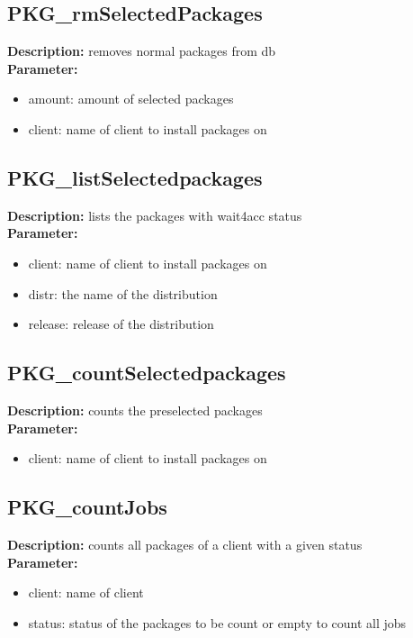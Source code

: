 \subsection{PKG\_rmSelectedPackages}
\textbf{Description:} removes normal packages from db\\
\textbf{Parameter:}
\begin{itemize}
\item amount: amount of selected packages
\item client: name of client to install packages on
\end{itemize}

\subsection{PKG\_listSelectedpackages}
\textbf{Description:} lists the packages with wait4acc status\\
\textbf{Parameter:}
\begin{itemize}
\item client: name of client to install packages on
\item distr: the name of the distribution
\item release: release of the distribution
\end{itemize}

\subsection{PKG\_countSelectedpackages}
\textbf{Description:} counts the preselected packages\\
\textbf{Parameter:}
\begin{itemize}
\item client: name of client to install packages on
\end{itemize}

\subsection{PKG\_countJobs}
\textbf{Description:} counts all packages of a client with a given status\\
\textbf{Parameter:}
\begin{itemize}
\item client: name of client
\item status: status of the packages to be count or empty to count all jobs
\end{itemize}

